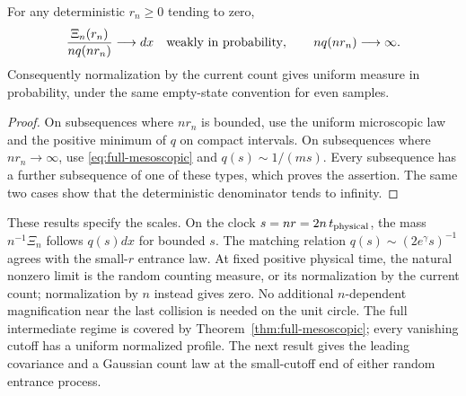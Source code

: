 \documentclass[11pt,letterpaper]{article}
\begin{document}
\begin{corollary}
\label{cor:all-vanishing-cutoffs}
For any deterministic $r_n\ge0$ tending to zero,
\[
 \frac{\Xi_n(r_n)}{nq(nr_n)}\longrightarrow dx
 \quad\hbox{weakly in probability},\qquad nq(nr_n)\longrightarrow\infty.
\]
Consequently normalization by the current count gives uniform measure
in probability, under the same empty-state convention for even samples.
\end{corollary}
\begin{proof}
On subsequences where $nr_n$ is bounded, use the uniform microscopic
law and the positive minimum of $q$ on compact intervals. On subsequences
where $nr_n\to\infty$, use \eqref{eq:full-mesoscopic} and
$q(s)\sim1/(ms)$. Every subsequence has a further subsequence of one
of these types, which proves the assertion. The same two cases show
that the deterministic denominator tends to infinity.
\end{proof}

These results specify the scales. On the clock $s=nr=2n\,t_{\rm physical}$,
the mass $n^{-1}\Xi_n$ follows $q(s)dx$ for bounded $s$.
The matching relation $q(s)\sim(2e^\gamma s)^{-1}$ agrees with the
small-$r$ entrance law. At fixed positive physical time, the natural
nonzero limit is the random counting measure, or its normalization by
the current count; normalization by $n$ instead gives zero. No additional
$n$-dependent magnification near the last collision is needed on the
unit circle. The full intermediate regime is covered by
Theorem~\ref{thm:full-mesoscopic}; every vanishing cutoff has a uniform
normalized profile. The next result gives the leading covariance and a
Gaussian count law at the small-cutoff end of either random entrance process.
\end{document}
